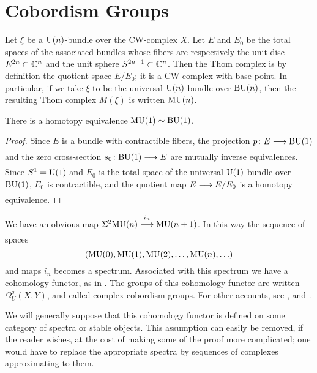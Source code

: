 \documentclass[../main]{subfiles}
\begin{document}
\chapter{Cobordism Groups}
\label{sec:p1c2}

Let $\xi$ be a $\mathrm{U}(n)$-bundle over the CW-complex $X$. 
Let $E$ and $E_0$ be the total spaces of the associated bundles whose fibers are respectively the unit disc $E^{2n} \subset \mathbb{C}^n$ and the unit sphere $S^{2n-1} \subset \mathbb{C}^n$.
Then the Thom complex is by definition the quotient space $E/E_0$; it is a CW-complex with base point. 
In particular, if we take $\xi$ to be the universal $\mathrm{U}(n)$-bundle over $\mathrm{BU}(n)$, then the resulting Thom complex $M(\xi)$ is written $\mathrm{MU}(n)$.
\begin{example}
\label{ex:p1c02.1}
There is a homotopy equivalence $\mathrm{MU}(1) \sim \mathrm{BU}(1)$.
\end{example}
\begin{proof}
Since $E$ is a bundle with contractible fibers, the projection $p\colon E \lar{} \te{BU}(1)$ and the zero cross-section $s_0\colon \te{BU}(1) \lar{} E$ are mutually inverse equivalences. 
Since $S^{1} = \mathrm{U}(1)$ and $E_0$ is the total space of the universal $\mathrm{U}(1)$-bundle over $\mathrm{BU}(1)$, $E_0$ is contractible, and the quotient map $E \lar{} E/E_0$ is a homotopy equivalence.
\end{proof}

We have an obvious map $\Sigma^2 \te{MU}(n) \stackrel{i_n}{\lar{}} \te{MU}(n+1)$. 
In this way the sequence of spaces 
\begin{equation*}
	(\mathrm{MU}(0), \mathrm{MU}(1), \mathrm{MU}(2), \ldots , \mathrm{MU}(n), \ldots)
\end{equation*}
and maps $i_n$ becomes a spectrum. 
Associated with this spectrum we have a cohomology functor, as in \cite{whitehead}. 
The groups of this cohomology functor are written $\Omega_U^q (X, Y)$, and called complex cobordism groups. 
For other accounts, see \cite{atiyah}, and \cite{connerfloyd}.

We will generally suppose that this cohomology functor is defined on some category of spectra or stable objects. 
This assumption can easily be removed, if the reader wishes, at the cost of making some of the proof more complicated; one would have to replace the appropriate spectra by sequences of complexes approximating to them.
\end{document}
